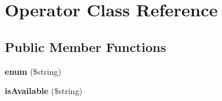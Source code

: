 \hypertarget{class_operator}{\section{Operator Class Reference}
\label{class_operator}
}
\subsection*{Public Member Functions}
\begin{DoxyCompactItemize}
\item 
\hypertarget{class_operator_a7967c6e825979f8b2faefba3d95c3821}{{\bfseries enum} (\$string)}\label{class_operator_a7967c6e825979f8b2faefba3d95c3821}

\item 
\hypertarget{class_operator_a30537daeb912ea3e348c579c4f930841}{{\bfseries is\+Available} (\$string)}\label{class_operator_a30537daeb912ea3e348c579c4f930841}

\end{DoxyCompactItemize}
